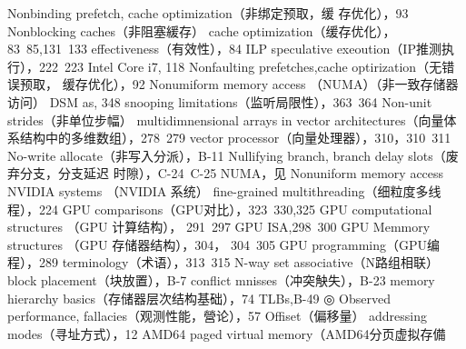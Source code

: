 Nonbinding prefetch, cache optimization（非绑定预取，缓
存优化），93
Nonblocking caches（非阻塞緩存）
cache optimization（缓存优化），83~85,131~133
effectiveness（有效性），84
ILP speculative exeoution（IP推测执行），222~223
Intel Core i7, 118
Nonfaulting prefetches,cache optirization（无错误预取，
缓存优化），92
Nonumiform memory access （NUMA）（非一致存储器访问）
DSM as, 348
snooping limitations（监听局限性），363~364
Non-unit strides（非单位步幅）
multidimnensional arrays in vector architectures（向量体
系结构中的多维数组），278~279
vector processor（向量处理器），310，310~311
No-write allocate（非写入分派），B-11
Nullifying branch, branch delay slots（废弃分支，分支延迟
时隙），C-24~C-25
NUMA，见 Nonuniform memory access
NVIDIA systems （NVIDIA 系统）
fine-grained multithreading（细粒度多线程），224
GPU comparisons（GPU对比），323~330,325
GPU computational structures （GPU 计算结构），
291~297
GPU ISA,298~300
GPU Memmory structures （GPU 存储器结构），304，
304~305
GPU programming（GPU编程），289
terminology（术语），313~315
N-way set associative（N路组相联）
block placement（块放置），B-7
conflict mnisses（冲突觖失），B-23
memory hierarchy basics（存储器层次结构基础），74
TLBs,B-49
◎
Observed performance, fallacies（观测性能，營论），57
Offiset（偏移量）
addressing modes（寻址方式），12
AMD64 paged virtual memory（AMD64分页虚拟存備
